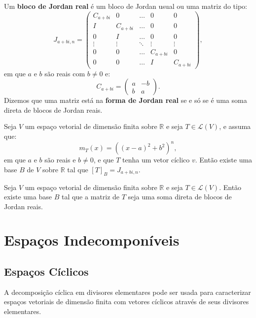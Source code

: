 \documentclass[11pt,twoside,a4paper]{book}
\begin{document}
\begin{definicao}
Um
\textbf{bloco de Jordan real} é um bloco de Jordan usual ou uma matriz do tipo:
\[
J_{a+bi,n} =
\begin{pmatrix}
C_{a+bi}&0&\ldots&0&0\\I&C_{a+bi}&\ldots&0&0\\0&I&\ldots&0&0\\\vdots&\vdots&\ddots&\vdots&\vdots\\0&0&\ldots&C_{a+bi}&0\\0&0&\ldots&I&C_{a+bi}
\end{pmatrix},
\]
em que $a$ e $b$ são reais com $b\neq 0$ e:
\[
C_{a+bi}=\begin{pmatrix}
a&-b\\b&a
\end{pmatrix}.
\]
Dizemos que uma matriz está na \textbf{forma de Jordan real} se e só se é uma soma direta de blocos de Jordan reais.
\end{definicao}

\begin{proposicao}
Seja $V$ um espaço vetorial de dimensão finita sobre $\mathbb{R}$ e seja $T\in\mathcal{L}(V)$, e assuma
que:
\[
m_T(x)=\left((x-a)^2+b^2\right)^n,
\]
em que $a$ e $b$ são reais e $b\neq 0$, e que $T$ tenha um vetor cíclico $v$. Então existe uma base $B$ de $V$ sobre $\mathbb{R}$ tal que $[T]_B=J_{a+bi,n}$.
\end{proposicao}

\begin{teorema}
Seja $V$ um espaço vetorial de dimensão finita sobre $\mathbb{R}$ e seja $T\in\mathcal{L}(V)$.
Então existe uma base $B$ tal que a matriz de $T$ seja uma soma direta de blocos de Jordan reais.
\end{teorema}

\section{Espaços Indecomponíveis}

\subsection{Espaços Cíclicos}

A decomposição cíclica em divisores elementares pode ser usada para caracterizar espaços vetoriais de dimensão finita com vetores cíclicos através de seus divisores elementares.
\end{document}
